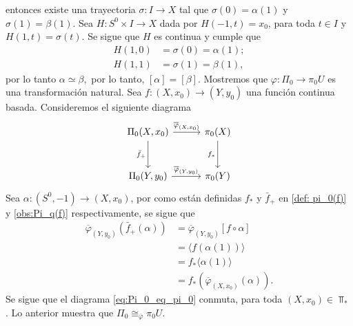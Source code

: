\begin{ejemplo}
    entonces existe una trayectoria $\sigma:I\to X$ tal que $\sigma(0)=\alpha(1)$ y $\sigma(1)=\beta(1)$. Sea $H:S^0\times I\to X$ dada por $H(-1,t)=x_0$, para toda $t\in I$ y $H(1,t)=\sigma(t)$. Se sigue que $H$ es continua y  cumple que 
    \begin{align*}
        H(1,0)&=\sigma(0)=\alpha(1);\\
        H(1,1)&=\sigma(1)=\beta(1),
    \end{align*}
    por lo tanto $\alpha\simeq \beta,$ por lo tanto, $[\alpha]=[\beta].$ Mostremos que $\varphi:\Pi_0\to \pi_0U$ es una transformación natural. Sea $f:(X,x_0)\to (Y,y_0)$ una función continua basada. Consideremos el siguiente diagrama
    \begin{equation}
    \label{eq:Pi_0_eq_pi_0}
    \begin{tikzcd}[column sep=1cm, row sep=1cm] 
       \Pi_0(X,x_0)\arrow[r,"\overline{\varphi}_{(X,x_0)}"] \arrow[d,"\bar{f}_+"'] & \pi_0(X)
        \arrow[d,"f_*"']\\
        \Pi_0(Y,y_0)\arrow[r,"\overline{\varphi}_{(Y,y_0)}"] & \pi_0(Y)
\end{tikzcd}
    \end{equation}
    Sea $\alpha:(S^0,-1)\to (X,x_0)$, por como están definidas $f_*$ y $\bar{f}_+$ en \ref{def: pi_0(f)} y \ref{obs:Pi_q(f)} respectivamente, se sigue que
    \begin{equation*}
        \begin{split}
            \overline{\varphi}_{(Y,y_0)}(\bar{f}_+(\alpha))&=\overline{\varphi}_{(Y,y_0)}[f\circ \alpha]\\
            &=\langle f(\alpha(1))\rangle\\
            &=f_*\langle\alpha(1)\rangle\\
            &=f_*(\overline{\varphi}_{(X,x_0)}(\alpha)).
        \end{split}
    \end{equation*}
    Se sigue que el diagrama \ref{eq:Pi_0_eq_pi_0} conmuta, para toda $(X,x_0)\in \Top_*$. Lo anterior muestra que $\Pi_0\cong_{\overline{\varphi}} \pi_0 U$.
\end{ejemplo}


